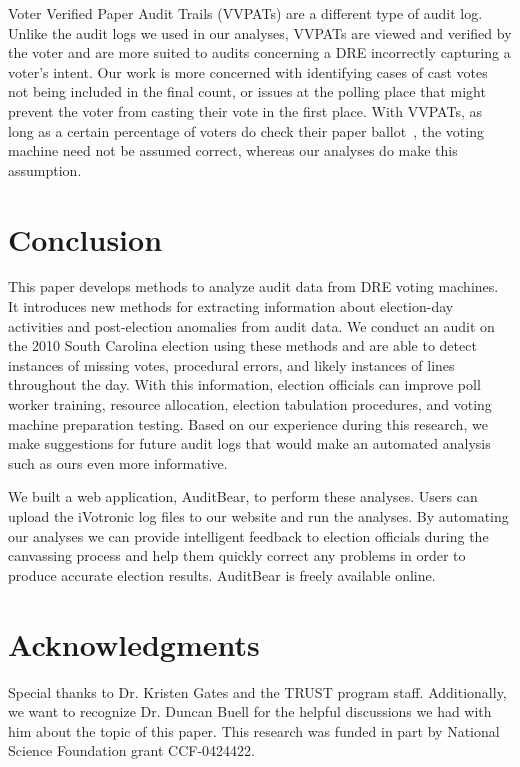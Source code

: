 \documentclass[letterpaper,twocolumn,10pt]{article}
\begin{document}
Voter Verified Paper Audit Trails (VVPATs) are a different type of audit
log. Unlike the audit logs we used in our analyses, VVPATs are viewed and
verified by the voter and are more suited to audits concerning a DRE incorrectly
capturing a voter’s intent. Our work is more concerned with identifying cases of
cast votes not being included in the final count, or issues at the polling place
that might prevent the voter from casting their vote in the first place. With
VVPATs, as long as a certain percentage of voters do check their paper
ballot~\cite{Hall2006}, the voting machine need not be assumed correct, whereas
our analyses do make this assumption. 

\section{Conclusion}
This paper develops methods to analyze audit data from DRE voting machines. It 
introduces new methods for extracting information about election-day activities
and post-election anomalies from audit data.  
We conduct an audit on the 2010 South Carolina 
election using these methods and are able to detect instances of missing votes,
procedural errors, and likely instances of lines throughout the day. With this
information, election officials can improve poll worker 
training, resource allocation, election tabulation procedures, and 
voting machine preparation testing. Based on our experience during this
research, we make suggestions for future audit logs that would make an automated
analysis such as ours even more informative.
 
We built a web application, AuditBear, to perform these analyses. Users can
upload the iVotronic log files to our website and run the analyses. By automating our
analyses we can provide intelligent feedback to election officials during the
canvassing process and help them quickly correct any problems in order to
produce accurate election results. AuditBear is freely available online.  
 

\section{Acknowledgments}
Special thanks to Dr. Kristen Gates and the TRUST
program staff.  Additionally, we want to recognize
Dr. Duncan Buell for the helpful discussions we had with him about the topic of
this paper. This research was funded in part by National Science Foundation
grant CCF-0424422.
\end{document}
